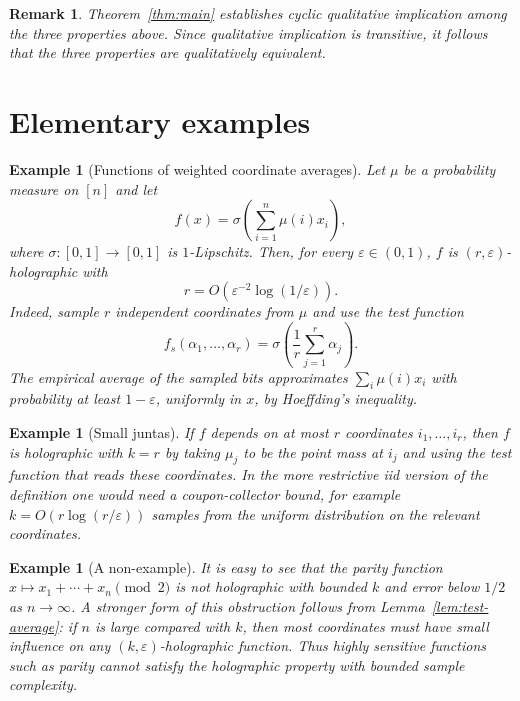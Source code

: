 \documentclass[11pt]{amsart}
\newtheorem{remark}[theorem]{Remark}
\newtheorem{example}[theorem]{Example}
\newcommand{\1}{\mathbf 1}
\begin{document}
\begin{remark}
Theorem~\ref{thm:main} establishes cyclic qualitative implication among the
three properties above.  Since qualitative implication is transitive, it follows
that the three properties are qualitatively equivalent.
\end{remark}


\section{Elementary examples}

\begin{example}[Functions of weighted coordinate averages]
Let $\mu$ be a probability measure on $[n]$ and let
\[
        f(x)=\sigma\left(\sum_{i=1}^n \mu(i)x_i\right),
\]
where $\sigma:[0,1]\to[0,1]$ is $1$-Lipschitz.  Then, for every $\varepsilon\in(0,1)$, $f$ is $(r,\varepsilon)$-holographic with
\[
        r=O(\varepsilon^{-2}\log(1/\varepsilon)).
\]
Indeed, sample $r$ independent coordinates from $\mu$ and use the test function
\[
        f_s(\alpha_1,\ldots,\alpha_r)
        =
        \sigma\left(\frac1r\sum_{j=1}^r\alpha_j\right).
\]
The empirical average of the sampled bits approximates $\sum_i\mu(i)x_i$ with probability at least $1-\varepsilon$, uniformly in $x$, by Hoeffding's inequality.
\end{example}


\begin{example}[Small juntas]
If $f$ depends on at most $r$ coordinates $i_1,\ldots,i_r$, then $f$ is holographic with $k=r$ by taking $\mu_j$ to be the point mass at $i_j$ and using the test function that reads these coordinates.  In the more restrictive iid version of the definition one would need a coupon-collector bound, for example $k=O(r\log(r/\varepsilon))$ samples from the uniform distribution on the relevant coordinates.
\end{example}

\begin{example}[A non-example]
It is easy to see that the parity function $x\mapsto x_1+\cdots+x_n\pmod 2$ is not holographic with bounded $k$ and error below $1/2$ as $n\to\infty$. A stronger form of this obstruction follows from Lemma~\ref{lem:test-average}:
if \(n\) is large compared with \(k\), then most coordinates must have small
influence on any \((k,\varepsilon)\)-holographic function.  Thus highly
sensitive functions such as parity cannot satisfy the holographic property with
bounded sample complexity.
\end{example}
\end{document}
